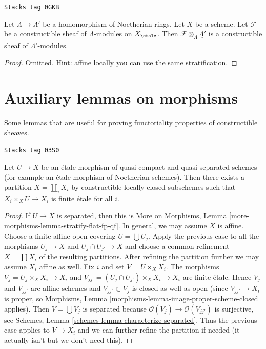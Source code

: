 \begin{lemma}
\label{etale-cohomology-lemma-tensor-constructible}
\href{https://stacks.math.columbia.edu/tag/0GKB}{\texttt{Stacks tag 0GKB}}

Let $\Lambda \to \Lambda'$ be a homomorphism of Noetherian rings.
Let $X$ be a scheme. Let $\mathcal{F}$ be a constructible
sheaf of $\Lambda$-modules on $X_\etale$. Then
$\mathcal{F} \otimes_{\underline{\Lambda}} \underline{\Lambda'}$
is a constructible sheaf of $\Lambda'$-modules.
\end{lemma}

\begin{proof}
Omitted. Hint: affine locally you can use the same stratification.
\end{proof}

\section{Auxiliary lemmas on morphisms}
\label{etale-cohomology-section-stratify-morphisms}
Some lemmas that are useful for proving functoriality properties
of constructible sheaves.

\begin{lemma}
\label{etale-cohomology-lemma-etale-stratified-finite}
\href{https://stacks.math.columbia.edu/tag/03S0}{\texttt{Stacks tag 03S0}}

Let $U \to X$ be an \'etale morphism of quasi-compact and quasi-separated
schemes (for example an \'etale morphism of Noetherian schemes). Then there
exists a partition $X = \coprod_i X_i$ by constructible locally closed
subschemes such that $X_i \times_X U \to X_i$ is finite \'etale for all $i$.
\end{lemma}

\begin{proof}
If $U \to X$ is separated, then this is
More on Morphisms, Lemma \ref{more-morphisms-lemma-stratify-flat-fp-qf}.
In general, we may assume $X$ is affine. Choose a finite affine open
covering $U = \bigcup U_j$. Apply the previous case to all the morphisms
$U_j \to X$ and $U_j \cap U_{j'} \to X$ and choose a common
refinement $X = \coprod X_i$ of the resulting partitions.
After refining the partition further we may assume $X_i$ affine as well.
Fix $i$ and set $V = U \times_X X_i$. The morphisms
$V_j = U_j \times_X X_i \to X_i$ and
$V_{jj'} = (U_j \cap U_{j'}) \times_X X_i \to X_i$ are finite \'etale.
Hence $V_j$ and $V_{jj'}$ are affine schemes and $V_{jj'} \subset V_j$
is closed as well as open (since $V_{jj'} \to X_i$ is proper, so
Morphisms, Lemma \ref{morphisms-lemma-image-proper-scheme-closed}
applies). Then $V = \bigcup V_j$ is separated because
$\mathcal{O}(V_j) \to \mathcal{O}(V_{jj'})$ is surjective, see
Schemes, Lemma \ref{schemes-lemma-characterize-separated}.
Thus the previous case applies to $V \to X_i$ and we can further
refine the partition if needed (it actually isn't but we don't
need this).
\end{proof}

